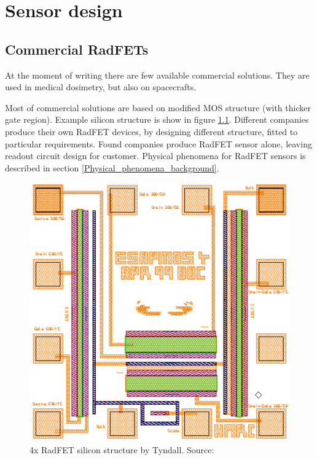\chapter{Sensor design}

\section{Commercial RadFETs}
At the moment of writing there are few available commercial solutions. They are used in medical dosimetry, but also on spacecrafts. 

Most of commercial solutions are based on modified MOS structure (with thicker gate region). Example silicon structure is show in figure \ref{Tyndall_radfet_silicon}. Different companies produce their own RadFET devices, by designing different structure, fitted to particular requirements. Found companies produce RadFET sensor alone, leaving readout circuit design for customer. Physical phenomena for RadFET sensors is described in section \ref{Physical_phenomena_background}.

\begin{figure}[H]
	\centering
	\includegraphics[width=0.5\paperwidth]{img/radfet-silicon.eps}
	\caption{4x RadFET silicon structure by Tyndall. Source: \cite{Tyndall_Radfet}}
	\label{Tyndall_radfet_silicon}
\end{figure}



